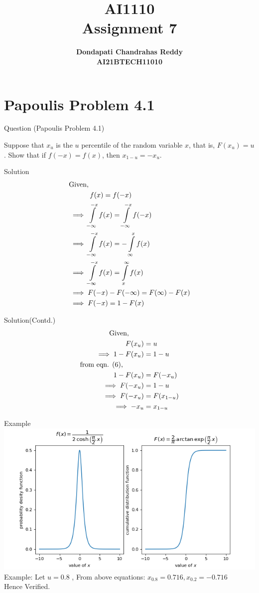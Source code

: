 \documentclass{beamer}
\title{\textbf{AI1110 \\ Assignment 7} }
\author{\textbf{Dondapati Chandrahas Reddy}\\\textbf{AI21BTECH11010}}
\begin{document}
	

\begin{frame}
	\titlepage 
\end{frame}


\section{Papoulis Problem 4.1}
\begin{frame}{Question (Papoulis Problem 4.1)}

Suppose that $x_u$ is the $u$ percentile of the random variable $x$, that is, $F(x_u) = u$. Show that if $f(-x) = f(x)$, then $x_{1-u} = -x_u$.

\end{frame}


\begin{frame}{Solution}
	\begin{align}
		&\text{Given,}\nonumber\\
		&\hspace{7ex}f(x) = f(-x)\\
		&\implies \int\limits_{-\infty}^{-x} f(x) = \int\limits_{-\infty}^{-x} f(-x)\\
		&\implies \int\limits_{-\infty}^{-x} f(x) = -\int\limits_{\infty}^{x} f(x)\\
		&\implies \int\limits_{-\infty}^{-x} f(x) = \int\limits_{x}^{\infty} f(x)\\
		&\implies F(-x) - F(-\infty) = F(\infty) - F(x)\\
		&\implies F(-x) = 1 - F(x)
	\end{align}
\end{frame}


\begin{frame}{Solution(Contd.)}
	\begin{align}
		\text{Given,}\hspace{5ex}&\nonumber\\
		\hspace{7ex} F(x_u) &= u\\
		\implies 1 - F(x_u) &= 1 - u\\
		\text{from eqn. (6),}\hspace{7ex}&\nonumber\\
		1 - F(x_u) &= F(-x_u)\\
		\implies F(-x_u) &= 1-u\\
		\implies F(-x_u) &= F(x_{1-u})\\
		\implies -x_u &= x_{1-u}
	\end{align}
\end{frame}


\begin{frame}{Example}
	\includegraphics[scale=0.595]{fig1.png}
	Example: Let $u = 0.8$ , From above equations: $x_{0.8} = 0.716, x_{0.2} = -0.716 $\\
	Hence Verified.
\end{frame}
\end{document}
